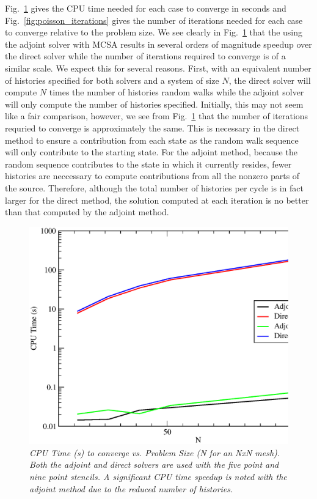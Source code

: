 \documentclass[preprint,12pt]{elsarticle}
\begin{document}
Fig.~\ref{fig:poisson_cpu_time} gives the CPU time needed for each
case to converge in seconds and Fig.~\ref{fig:poisson_iterations}
gives the number of iterations needed for each case to converge
relative to the problem size. We see clearly in
Fig.~\ref{fig:poisson_cpu_time} that the using the adjoint solver with
MCSA results in several orders of magnitude speedup over the direct
solver while the number of iterations required to converge is of a
similar scale. We expect this for several reasons. First, with an
equivalent number of histories specified for both solvers and a system
of size $N$, the direct solver will compute $N$ times the number of
histories random walks while the adjoint solver will only compute the
number of histories specified. Initially, this may not seem like a
fair comparison, however, we see from Fig.~\ref{fig:poisson_cpu_time}
that the number of iterations requried to converge is approximately
the same. This is necessary in the direct method to ensure a
contribution from each state as the random walk sequence will only
contribute to the starting state. For the adjoint method, because the
random sequence contributes to the state in which it currently
resides, fewer histories are neccessary to compute contributions from
all the nonzero parts of the source. Therefore, although the total
number of histories per cycle is in fact larger for the direct method,
the solution computed at each iteration is no better than that
computed by the adjoint method.

\begin{figure}[htpb!]
  \centering
  \includegraphics[width=5in,clip]{Adjoint_Direct_CPU_Time.eps}
  \caption{\sl CPU Time (s) to converge vs. Problem Size (N for an NxN
    mesh). Both the adjoint and direct solvers are used with the five
    point and nine point stencils. A significant CPU time speedup is
    noted with the adjoint method due to the reduced number of
    histories.}
  \label{fig:poisson_cpu_time}
\end{figure}
\end{document}
